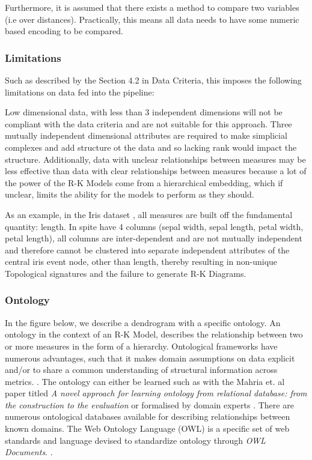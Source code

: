 Furthermore, it is assumed that there exists a method to compare two variables (i.e over distances). Practically, this means all data needs to have some numeric based encoding to be compared.

\subsubsection{Limitations}
Such as described by the Section 4.2 in Data Criteria, this imposes the following limitations on data fed into the pipeline:

Low dimensional data, with less than 3 independent dimensions will not be compliant with the data criteria and are not suitable for this approach. Three mutually independent dimensional attributes are required to make simplicial complexes and add structure ot the data and so lacking rank would impact the structure. Additionally, data with unclear relationships between measures may be less effective than data with clear relationships between measures because a lot of the power of the R-K Models come from a hierarchical embedding, which if unclear, limits the ability for the models to perform as they should.

As an example, in the Iris dataset \cite{iris_dataset}, all measures are built off the fundamental quantity: length. In spite have 4 columns (sepal width, sepal length, petal width, petal length), all columns are inter-dependent and are not mutually independent and therefore cannot be clustered into separate independent attributes of the central iris event node, other than length, thereby resulting in non-unique Topological signatures and the failure to generate  R-K Diagrams.

\subsubsection{Ontology}

In the figure below, we describe a dendrogram with a specific ontology. An ontology in the context of an R-K Model, describes the relationship between two or more measures in the form of a hierarchy. Ontological frameworks have numerous advantages, such that it makes domain assumptions on data explicit and/or to share a common understanding of structural information across metrics. \cite{ben_mahria_chaker_zahi_2021}. The ontology can either be learned such as with the Mahria et. al paper titled \textit{A novel approach for learning ontology from relational database: from the construction to the evaluation} or formalised by domain experts \cite{ben_mahria_chaker_zahi_2021}. There are numerous ontological databases available for describing relationships between known domains. The Web Ontology Language (OWL) is a specific set of web standards and language devised to standardize ontology through \textit{OWL Documents}. \cite{owl_semantic_web_standards_2012}.


